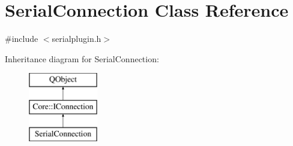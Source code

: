 \hypertarget{class_serial_connection}{\section{Serial\-Connection Class Reference}
\label{class_serial_connection}
}


{\ttfamily \#include $<$serialplugin.\-h$>$}

Inheritance diagram for Serial\-Connection\-:\begin{figure}[H]
\begin{center}
\leavevmode
\includegraphics[height=3.000000cm]{class_serial_connection}
\end{center}
\end{figure}
